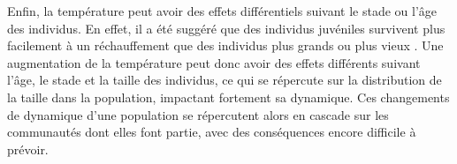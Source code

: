 Enfin, la température peut avoir des effets différentiels suivant le stade ou
l'âge des individus. En effet, il a été suggéré que des individus juvéniles
survivent plus facilement à un réchauffement que des individus plus grands ou
plus vieux \autocites{peck2009a}. Une augmentation de la température peut donc
avoir des effets différents suivant l'âge, le stade et la taille des individus,
ce qui se répercute sur la distribution de la taille dans la population, impactant
fortement sa dynamique. Ces changements de dynamique d'une population se
répercutent alors en cascade sur les communautés dont elles font partie, avec
des conséquences encore difficile à prévoir. 
